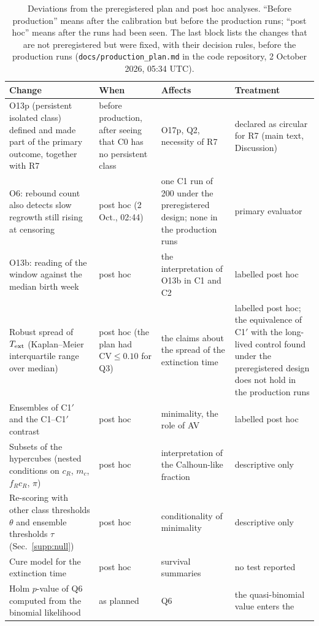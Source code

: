 \documentclass[pre,onecolumn,superscriptaddress,notitlepage]{revtex4-2}
\begin{document}
\begin{table}[ht]
\centering
\caption{Deviations from the preregistered plan and post hoc analyses. ``Before production'' means after the
calibration but before the production runs; ``post hoc'' means after the runs had been seen. The last block lists
the changes that are not preregistered but were fixed, with their decision rules, before the production runs
(\texttt{docs/production\_plan.md} in the code repository, 2 October 2026, 05:34 UTC).}
\label{tab:deviations}
\scriptsize
\setlength{\tabcolsep}{3pt}
\begin{tabular}{@{}p{5.2cm}p{2.8cm}p{4.4cm}p{4.0cm}@{}}
\toprule
Change & When & Affects & Treatment \\
\midrule
O13p (persistent isolated class) defined and made part of the primary outcome, together with R7 & before
production, after seeing that \textsf{C0} has no persistent class & O17p, Q2, necessity of R7 & declared as
circular for R7 (main text, Discussion) \\
O6: rebound count also detects slow regrowth still rising at censoring & post hoc (2 Oct., 02:44) & one
\textsf{C1} run of 200 under the preregistered design; none in the production runs & primary evaluator \\
O13b: reading of the window against the median birth week & post hoc & the interpretation of O13b in \textsf{C1}
and \textsf{C2} & labelled post hoc \\
Robust spread of $T_{\rm ext}$ (Kaplan--Meier interquartile range over median) & post hoc (the plan had
$\mathrm{CV}\le0.10$ for Q3) & the claims about the spread of the extinction time & labelled post hoc; the
equivalence of \textsf{C1}$'$ with the long-lived control found under the preregistered design does not hold in the production runs \\
Ensembles of \textsf{C1}$'$ and the \textsf{C1}--\textsf{C1}$'$ contrast & post hoc & minimality, the role of AV &
labelled post hoc \\
Subsets of the hypercubes (nested conditions on $c_R$, $m_c$, $f_Rc_R$, $\pi$) & post hoc & interpretation of the
Calhoun-like fraction & descriptive only \\
Re-scoring with other class thresholds $\theta$ and ensemble thresholds $\tau$ (Sec.~\ref{supp:null}) & post hoc & conditionality of minimality & descriptive only \\
Cure model for the extinction time & post hoc & survival summaries & no test reported \\
Holm $p$-value of Q6 computed from the binomial likelihood & as planned & Q6 & the quasi-binomial value enters the

\end{tabular}
\end{table}
\end{document}
